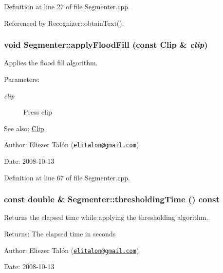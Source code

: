 Definition at line 27 of file Segmenter.cpp.

Referenced by Recognizer::obtainText().\hypertarget{class_segmenter_327c88f2d55cb606a67ce778c06cf426}{
\subsubsection[applyFloodFill]{\setlength{\rightskip}{0pt plus 5cm}void Segmenter::applyFloodFill (const {\bf Clip} \& {\em clip})}}
\label{class_segmenter_327c88f2d55cb606a67ce778c06cf426}


Applies the flood fill algorithm. 

\begin{Desc}
\item[Parameters:]
\begin{description}
\item[{\em clip}]Press clip\end{description}
\end{Desc}
\begin{Desc}
\item[See also:]\hyperlink{class_clip}{Clip}\end{Desc}
\begin{Desc}
\item[Author:]Eliezer Talón (\href{mailto:elitalon@gmail.com}{\tt elitalon@gmail.com}) \end{Desc}
\begin{Desc}
\item[Date:]2008-10-13 \end{Desc}


Definition at line 67 of file Segmenter.cpp.\hypertarget{class_segmenter_52f771c61d667df4f552ee73dc9f22e7}{
\subsubsection[thresholdingTime]{\setlength{\rightskip}{0pt plus 5cm}const double \& Segmenter::thresholdingTime () const}}
\label{class_segmenter_52f771c61d667df4f552ee73dc9f22e7}


Returns the elapsed time while applying the thresholding algorithm. 

\begin{Desc}
\item[Returns:]The elapsed time in seconds\end{Desc}
\begin{Desc}
\item[Author:]Eliezer Talón (\href{mailto:elitalon@gmail.com}{\tt elitalon@gmail.com}) \end{Desc}
\begin{Desc}
\item[Date:]2008-10-13 \end{Desc}


